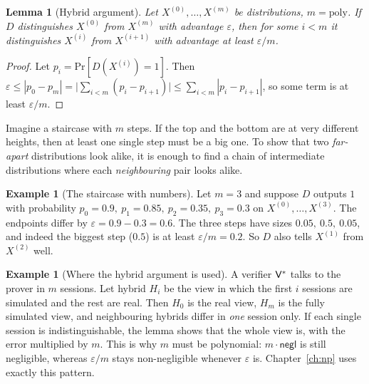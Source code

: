 \documentclass[11pt,a4paper]{report}
\theoremstyle{plain}
\newtheorem{lemma}[theorem]{Lemma}
\theoremstyle{definition}
\newtheorem{example}[theorem]{Example}
\theoremstyle{remark}
\newcommand{\negl}{\mathsf{negl}}
\newcommand{\poly}{\mathrm{poly}}
\renewcommand{\Pr}{\mathrm{Pr}}
\begin{document}
\begin{lemma}[Hybrid argument]\label{lem:hybrid}
Let $X^{(0)},\dots,X^{(m)}$ be distributions, $m=\poly$. If $D$ distinguishes $X^{(0)}$ from $X^{(m)}$ with advantage $\varepsilon$, then for some $i<m$ it distinguishes $X^{(i)}$ from $X^{(i+1)}$ with advantage at least $\varepsilon/m$.
\end{lemma}
\begin{proof}
Let $p_i=\Pr[D(X^{(i)})=1]$. Then $\varepsilon\le|p_0-p_m|=\big|\sum_{i<m}(p_i-p_{i+1})\big|\le\sum_{i<m}|p_i-p_{i+1}|$, so some term is at least $\varepsilon/m$.
\end{proof}
\begin{plain}\PE
Imagine a staircase with $m$ steps. If the top and the bottom are at very different heights, then at least one single step must be a big one. To show that two \emph{far-apart} distributions look alike, it is enough to find a chain of intermediate distributions where each \emph{neighbouring} pair looks alike.
\end{plain}
\begin{example}[The staircase with numbers]
Let $m=3$ and suppose $D$ outputs $1$ with probability $p_0=0.9,\ p_1=0.85,\ p_2=0.35,\ p_3=0.3$ on $X^{(0)},\dots,X^{(3)}$. The endpoints differ by $\varepsilon=0.9-0.3=0.6$. The three steps have sizes $0.05,\ 0.5,\ 0.05$, and indeed the biggest step ($0.5$) is at least $\varepsilon/m=0.2$. So $D$ also tells $X^{(1)}$ from $X^{(2)}$ well.
\end{example}
\begin{example}[Where the hybrid argument is used]
A verifier $\mathsf{V}^*$ talks to the prover in $m$ sessions. Let hybrid $H_i$ be the view in which the first $i$ sessions are simulated and the rest are real. Then $H_0$ is the real view, $H_m$ is the fully simulated view, and neighbouring hybrids differ in \emph{one} session only. If each single session is indistinguishable, the lemma shows that the whole view is, with the error multiplied by $m$. This is why $m$ must be polynomial: $m\cdot\negl$ is still negligible, whereas $\varepsilon/m$ stays non-negligible whenever $\varepsilon$ is. Chapter~\ref{ch:np} uses exactly this pattern.
\end{example}

\end{document}
